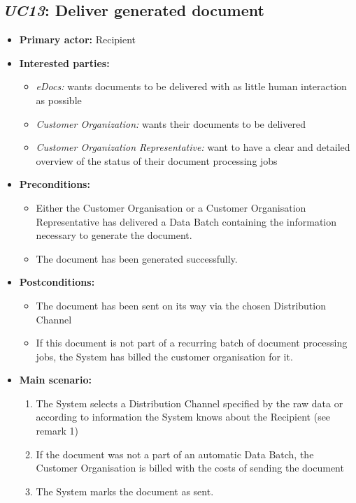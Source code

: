 \documentclass[a4paper,10pt]{article}
\begin{document}
\subsection{\emph{UC13}: Deliver generated document}
\begin{itemize}
    \item \textbf{Primary actor:} Recipient
    \item \textbf{Interested parties:} 
        \begin{itemize}
            \item \textit{eDocs:} wants documents to be delivered with as little human interaction as possible
            \item \textit{Customer Organization:} wants their documents to be delivered
            \item \textit{Customer Organization Representative:} want to have a clear and detailed overview of the status of their document processing jobs
        \end{itemize}

    \item \textbf{Preconditions:}
        \begin{itemize}
            \item Either the Customer Organisation or a Customer Organisation Representative has delivered a Data Batch containing the information necessary to generate the document.
            \item The document has been generated successfully.
        \end{itemize}

    \item \textbf{Postconditions:}
        \begin{itemize}
            \item The document has been sent on its way via the chosen Distribution Channel
            \item If this document is not part of a recurring batch of document processing jobs, the System has billed the customer organisation for it.
        \end{itemize}
        
    \item \textbf{Main scenario:} 
    \begin{enumerate}
       \item The System selects a Distribution Channel specified by the raw data or according to information the System knows about the Recipient (see remark 1)
       \item If the document was not a part of an automatic Data Batch, the Customer Organisation is billed with the costs of sending the document
       \item The System marks the document as sent.
    \end{enumerate}


\end{itemize}
\end{document}

